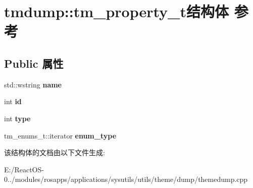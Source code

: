 \hypertarget{structtmdump_1_1tm__property__t}{}\section{tmdump\+:\+:tm\+\_\+property\+\_\+t结构体 参考}
\label{structtmdump_1_1tm__property__t}
\subsection*{Public 属性}
\begin{DoxyCompactItemize}
\item 
\mbox{\label{structtmdump_1_1tm__property__t_a3da74bcc3ed42d60a813469e44b5da9a}} 
std\+::wstring {\bfseries name}
\item 
\mbox{\label{structtmdump_1_1tm__property__t_a0a4e6d510f3b8c62c50dd6f352ce2d38}} 
int {\bfseries id}
\item 
\mbox{\label{structtmdump_1_1tm__property__t_a5cf92778c3107a7e6c919131450b137a}} 
int {\bfseries type}
\item 
\mbox{\label{structtmdump_1_1tm__property__t_a5c6011fcc30509fa9be36f1018045d7f}} 
tm\+\_\+enums\+\_\+t\+::iterator {\bfseries enum\+\_\+type}
\end{DoxyCompactItemize}


该结构体的文档由以下文件生成\+:\begin{DoxyCompactItemize}
\item 
E\+:/\+React\+O\+S-\/0../modules/rosapps/applications/sysutils/utils/theme/dump/themedump.\+cpp\end{DoxyCompactItemize}
